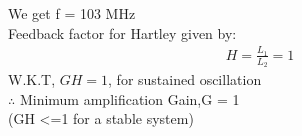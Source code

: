 \begin{enumerate}[label=\thesection.\arabic*.,ref=\thesection.\theenumi]
We get f = 103 MHz\\
Feedback factor for Hartley given by:
\begin{align}
H =\frac{L_1}{L_2}= 1
\end{align}
W.K.T, $GH = 1$, for sustained oscillation \\
$\therefore$ Minimum amplification Gain,G = 1\\ (GH <=1 for a stable system) \\
\end{enumerate}
